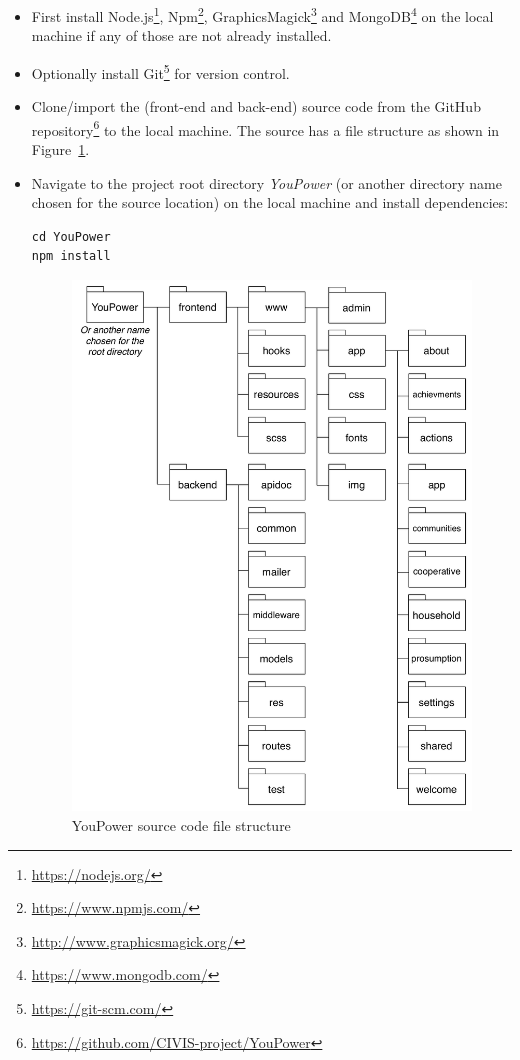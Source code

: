 \begin{itemize}
\item First install Node.js\footnote{\url{https://nodejs.org/}}, Npm\footnote{\url{https://www.npmjs.com/}}, GraphicsMagick\footnote{\url{http://www.graphicsmagick.org/}} and MongoDB\footnote{\url{https://www.mongodb.com/}} on the local machine if any of those are not already installed. 

\item Optionally install Git\footnote{\url{https://git-scm.com/}} for version control.

\item Clone/import the (front-end and back-end) source code from the GitHub repository\footnote{\url{https://github.com/CIVIS-project/YouPower}} to the local machine. The source has a file structure as shown in Figure~\ref{fig:files}. 

\item Navigate to the project root directory \textit{YouPower} (or another directory name chosen for the source location) on the local machine and install dependencies: 
\begin{lstlisting}
cd YouPower
npm install
\end{lstlisting}

\begin{figure}
\centering
\includegraphics[width=0.9\linewidth]{img/files}
\caption{YouPower source code file structure}
\label{fig:files}
\end{figure}


\end{itemize}
